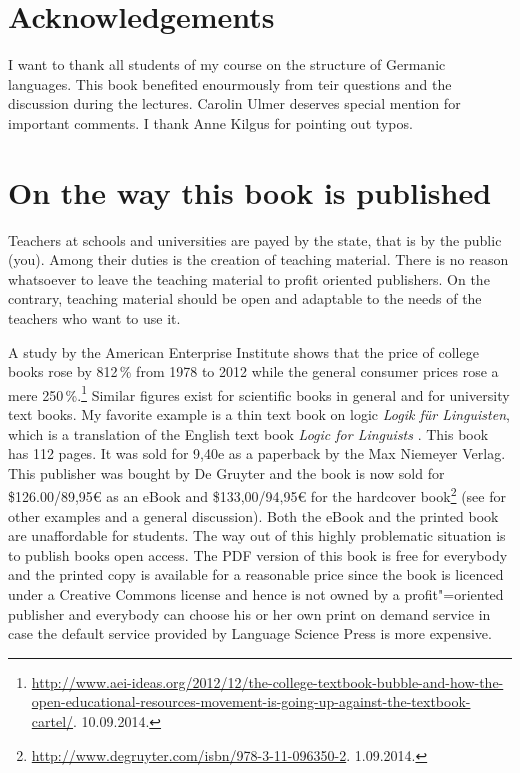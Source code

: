 \section*{Acknowledgements}

I want to thank all students of my course on the structure of Germanic languages. This book
benefited enourmously from teir questions and the discussion during the lectures. 
Carolin Ulmer %
deserves special mention for important comments. I thank Anne
Kilgus for pointing out typos.


\section*{On the way this book is published}

Teachers at schools and universities are payed by the state, that is by the public (you). Among
their duties is the creation of teaching material. There is no reason whatsoever to leave the
teaching material to profit oriented publishers. On the contrary, teaching material should be open
and adaptable to the needs of the teachers who want to use it. 

A study by the American Enterprise Institute shows that the price of college books rose by 812\,\%
from 1978 to 2012 while the general consumer prices rose a mere 250\,\%.\footnote{
\url{http://www.aei-ideas.org/2012/12/the-college-textbook-bubble-and-how-the-open-educational-resources-movement-is-going-up-against-the-textbook-cartel/}.
10.09.2014.%
} Similar figures exist for scientific books in general and for university text books. My favorite example is a thin text book
on logic \emph{Logik für Linguisten}, which is a translation of the English text book \emph{Logic for
Linguists} \citep{AAD73a}. This book has 112 pages. It was sold for 9,40e as a paperback by the Max Niemeyer
Verlag. This publisher was bought by De Gruyter and the book is now sold for \$126.00/89,95€ as an
eBook and \$133,00/94,95€ for the hardcover book\footnote{
  \url{http://www.degruyter.com/isbn/978-3-11-096350-2}. 1.09.2014.
} (see \citealp{MuellerOA} for other examples and a general discussion). Both the eBook and the printed book are unaffordable for students. The way out of this highly
problematic situation is to publish books open access. The PDF version of this book is free for
everybody and the printed copy is available for a reasonable price since the book is licenced under
a Creative Commons license and hence is not owned by a
profit"=oriented publisher and everybody can choose his or her own print on demand service in case
the default service provided by Language Science Press is more expensive.

